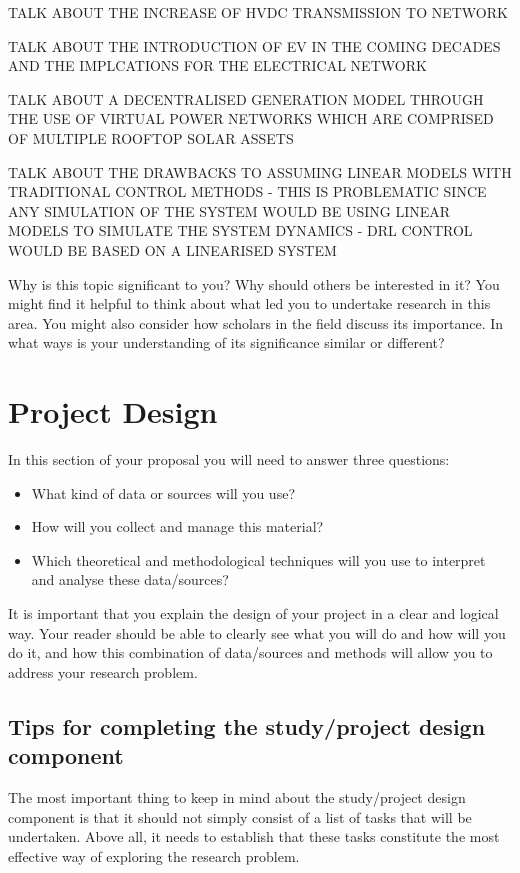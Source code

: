 \documentclass[12pt, a4paper]{article}
\begin{document}
TALK ABOUT THE INCREASE OF HVDC TRANSMISSION TO NETWORK

TALK ABOUT THE INTRODUCTION OF EV IN THE COMING DECADES AND THE IMPLCATIONS FOR THE ELECTRICAL NETWORK

TALK ABOUT A DECENTRALISED GENERATION MODEL THROUGH THE USE OF VIRTUAL POWER NETWORKS WHICH ARE COMPRISED OF MULTIPLE ROOFTOP SOLAR ASSETS

TALK ABOUT THE DRAWBACKS TO ASSUMING LINEAR MODELS WITH TRADITIONAL CONTROL METHODS - THIS IS PROBLEMATIC SINCE ANY SIMULATION OF THE SYSTEM WOULD BE USING LINEAR MODELS TO SIMULATE THE SYSTEM DYNAMICS - DRL CONTROL WOULD BE BASED ON A LINEARISED SYSTEM

Why is this topic significant to you? Why should others be interested in it? You might find it helpful to think about what led you to undertake research in this area. You might also consider how scholars in the field discuss its importance. In what ways is your understanding of its significance similar or different?

\section{Project Design}
In this section of your proposal you will need to answer three questions:
\begin{itemize}
\item What kind of data or sources will you use?
\item How will you collect and manage this material?
\item Which theoretical and methodological techniques will you use to interpret and analyse these data/sources?
\end{itemize}

It is important that you explain the design of your project in a clear and logical way. Your reader should be able to clearly see what you will do and how will you do it, and how this combination of data/sources and methods will allow you to address your research problem.

\subsection{Tips for completing the study/project design component}
The most important thing to keep in mind about the study/project design component is that it should not simply consist of a list of tasks that will be undertaken. Above all, it needs to establish that these tasks constitute the most effective way of exploring the research problem.
\end{document}
